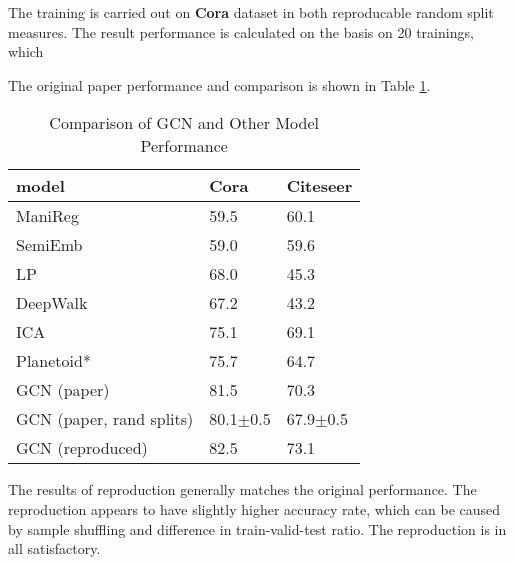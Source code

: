 The training is carried out on \textbf{Cora} dataset\cite{Sen_Namata_Bilgic_Getoor_Galligher_Eliassi-Rad_2008} in both reproducable random split measures. The result performance is calculated on the basis on 20 trainings, which 

The original paper performance and comparison is shown in Table \ref{result-comparison}.

\begin{table}[H]
    \centering
    \small
    \begin{tabular}{lll}
        \hline
        model & Cora & Citeseer \\
        \hline
        ManiReg\cite{ManiReg} & 59.5 & 60.1 \\
        SemiEmb\cite{SemiEmb} & 59.0 & 59.6 \\
        LP\cite{LP} & 68.0 & 45.3 \\
        DeepWalk\cite{DeepWalk} & 67.2 & 43.2 \\
        ICA\cite{ICA} & 75.1 & 69.1 \\
        Planetoid*\cite{DBLP:journals/corr/YangCS16} & 75.7 & 64.7 \\
        GCN (paper) & 81.5 & 70.3 \\
        GCN (paper, rand splits) & 80.1$\pm$0.5 & 67.9$\pm$0.5 \\
        \hline
        GCN (reproduced) & 82.5 & 73.1 \\
        \hline
    \end{tabular}
    \caption{Comparison of GCN and Other Model Performance}
    \label{result-comparison}
\end{table}


The results of reproduction generally matches the original performance. The reproduction appears to have slightly higher accuracy rate, which can be caused by sample shuffling and difference in train-valid-test ratio. The reproduction is in all satisfactory.
